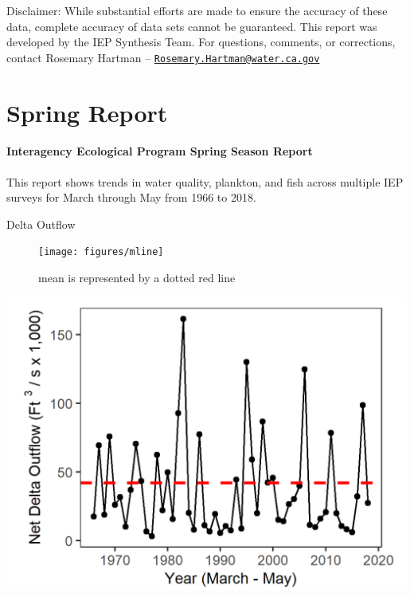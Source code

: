 \documentclass[
]{book}
\begin{document}
\begin{disclaimer}
Disclaimer: While substantial efforts are made to ensure the accuracy of
these data, complete accuracy of data sets cannot be guaranteed. This
report was developed by the IEP Synthesis Team. For questions, comments,
or corrections, contact Rosemary Hartman --
\href{mailto:Rosemary.Hartman@water.ca.gov}{\nolinkurl{Rosemary.Hartman@water.ca.gov}}
\end{disclaimer}

\hypertarget{Spring}{%
\chapter{Spring Report}\label{Spring}}

\hypertarget{interagency-ecological-program-spring-season-report}{%
\subsubsection{Interagency Ecological Program Spring Season Report}\label{interagency-ecological-program-spring-season-report}}

This report shows trends in water quality, plankton, and fish across multiple IEP
surveys for March through May from 1966 to 2018.

Delta Outflow

\begin{figure}
\texttt{[image: figures/mline]} \caption{mean is represented by a dotted red line}\label{fig:unnamed-chunk-4}
\end{figure}

\includegraphics[width=15.25in]{figures/spring_outflow_update}
\end{document}
